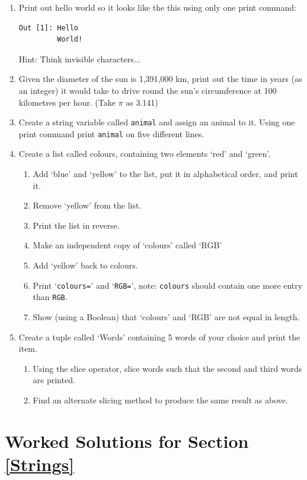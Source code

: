 \begin{enumerate}
\item Print out hello world so it looks like the this using only one print command:
\begin{lstlisting}[style=PY_out] 
Out [1]: Hello
         World!
\end{lstlisting}
\noindent Hint: Think invisible characters...

\item Given the diameter of the sun is 1,391,000 km, print out the time in years (as an integer) it would take to drive round the sun's circumference at 100 kilometres per hour. (Take $\pi$ as 3.141)
\item Create a string variable called \texttt{animal} and assign an animal to it. Using one print command print \texttt{animal} on five different lines.
\item Create a list called colours, containing two elements `red' and `green'.
\begin{enumerate}
\item Add `blue' and `yellow' to the list, put it in alphabetical order, and print it.
\item Remove `yellow' from the list.
\item Print the list in reverse.
\item Make an independent copy of `colours' called `RGB'
\item Add `yellow' back to colours.
\item Print `{\tt colours=}' and `{\tt RGB=}', note: {\tt colours} should contain one more entry than {\tt RGB}.
\item Show (using a Boolean) that `colours' and `RGB' are not equal in length.
\end{enumerate}
\item Create a tuple called `Words' containing 5 words of your choice and print the item.
\begin{enumerate}
\item Using the slice operator, slice words such that the second and third words are printed.
\item Find an alternate slicing method to produce the same result as above.
\end{enumerate}
\end{enumerate}

\newpage

\section{Worked Solutions for Section \ref{Strings}}
\label{workedanswerslab2}

